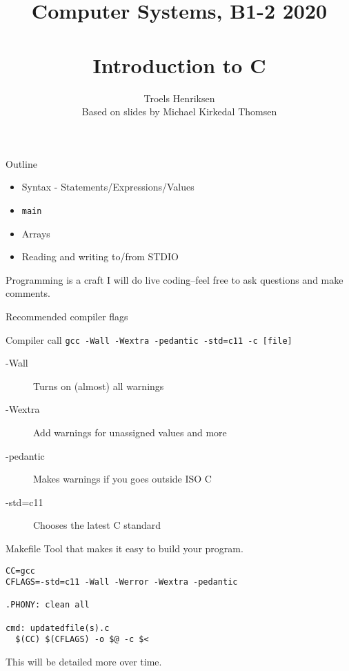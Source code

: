 \documentclass{beamer}
\title{Computer Systems, B1-2 2020\\~\\Introduction to C}
\author{Troels Henriksen\\Based on slides by Michael Kirkedal Thomsen}
\begin{document}
\begin{frame}[plain]
    \titlepage
\end{frame}


\begin{frame}{Outline}
\begin{itemize}
\item Syntax - Statements/Expressions/Values
\item \texttt{main}
\item Arrays
\item Reading and writing to/from STDIO
\end{itemize}
\pause

\begin{block}{Programming is a craft}
  I will do live coding--feel free to ask questions and make comments.
\end{block}

\end{frame}

\begin{frame}{Recommended compiler flags }

\begin{block}{Compiler call}
\texttt{gcc -Wall -Wextra -pedantic -std=c11 -c [file] }
\end{block}

\begin{description}
\item[-Wall] Turns on (almost) all warnings
\item[-Wextra] Add warnings for unassigned values and more
\item[-pedantic] Makes warnings if you goes outside ISO C
\item[-std=c11] Chooses the latest C standard
\end{description}

\end{frame}



\begin{frame}[fragile]{Makefile}
Tool that makes it easy to build your program.

\begin{block}{}
\begin{lstlisting}
CC=gcc
CFLAGS=-std=c11 -Wall -Werror -Wextra -pedantic

.PHONY: clean all

cmd: updatedfile(s).c
  $(CC) $(CFLAGS) -o $@ -c $<
\end{lstlisting}
\end{block}

This will be detailed more over time.

\end{frame}
\end{document}
